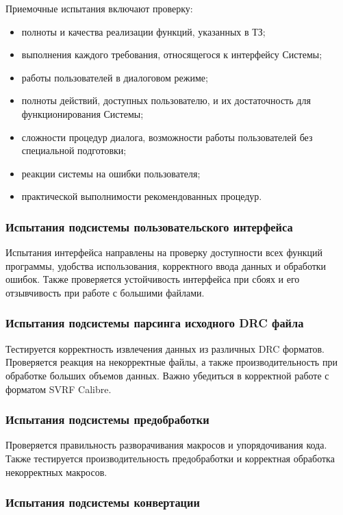 Приемочные испытания включают проверку:

\begin{itemize}
	\item полноты и качества реализации функций, указанных в ТЗ;
	\item выполнения каждого требования, относящегося к интерфейсу Системы;
	\item работы пользователей в диалоговом режиме;
	\item полноты действий, доступных пользователю,
		и их достаточность для функционирования Системы;
	\item сложности процедур диалога,
		возможности работы пользователей без специальной подготовки;
	\item реакции системы на ошибки пользователя;
	\item практической выполнимости рекомендованных процедур.
\end{itemize}

\subsubsection{Испытания подсистемы пользовательского интерфейса}

Испытания интерфейса направлены на проверку доступности всех функций программы,
удобства использования, корректного ввода данных и обработки ошибок.
Также проверяется устойчивость интерфейса при сбоях
и его отзывчивость при работе с большими файлами.


\subsubsection{Испытания подсистемы парсинга исходного DRC файла}

Тестируется корректность извлечения данных из различных DRC форматов.
Проверяется реакция на некорректные файлы,
а также производительность при обработке больших объемов данных.
Важно убедиться в корректной работе с форматом SVRF Calibre.

\subsubsection{Испытания подсистемы предобработки}

Проверяется правильность разворачивания макросов и упорядочивания кода.
Также тестируется производительность предобработки
и корректная обработка некорректных макросов.

\subsubsection{Испытания подсистемы конвертации}

